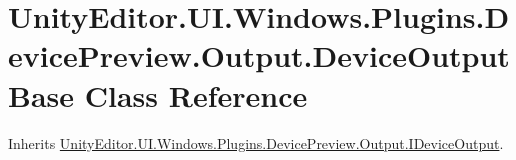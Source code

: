 \hypertarget{class_unity_editor_1_1_u_i_1_1_windows_1_1_plugins_1_1_device_preview_1_1_output_1_1_device_output_base}{}\section{Unity\+Editor.\+U\+I.\+Windows.\+Plugins.\+Device\+Preview.\+Output.\+Device\+Output\+Base Class Reference}
\label{class_unity_editor_1_1_u_i_1_1_windows_1_1_plugins_1_1_device_preview_1_1_output_1_1_device_output_base}


Inherits \hyperlink{interface_unity_editor_1_1_u_i_1_1_windows_1_1_plugins_1_1_device_preview_1_1_output_1_1_i_device_output}{Unity\+Editor.\+U\+I.\+Windows.\+Plugins.\+Device\+Preview.\+Output.\+I\+Device\+Output}.

